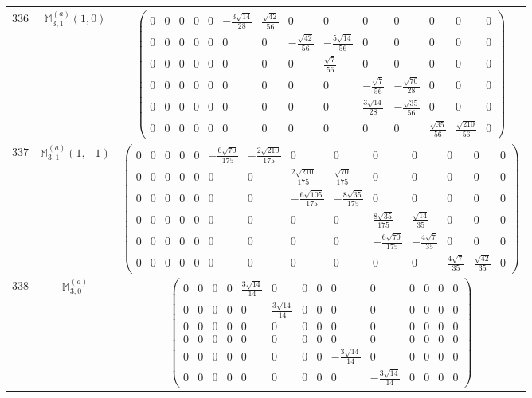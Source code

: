 \documentclass[fleqn,8pt,landscape]{jsarticle}
\begin{document}
\begin{center}
\begin{longtable}{ccc}
$ 336 $ & $ \mathbb{M}_{3,1}^{(a)}(1,0) $ & $ \begin{pmatrix} 0 & 0 & 0 & 0 & 0 & - \frac{3 \sqrt{14}}{28} & \frac{\sqrt{42}}{56} & 0 & 0 & 0 & 0 & 0 & 0 & 0 \\ 0 & 0 & 0 & 0 & 0 & 0 & 0 & - \frac{\sqrt{42}}{56} & - \frac{5 \sqrt{14}}{56} & 0 & 0 & 0 & 0 & 0 \\ 0 & 0 & 0 & 0 & 0 & 0 & 0 & 0 & \frac{\sqrt{7}}{56} & 0 & 0 & 0 & 0 & 0 \\ 0 & 0 & 0 & 0 & 0 & 0 & 0 & 0 & 0 & - \frac{\sqrt{7}}{56} & - \frac{\sqrt{70}}{28} & 0 & 0 & 0 \\ 0 & 0 & 0 & 0 & 0 & 0 & 0 & 0 & 0 & \frac{3 \sqrt{14}}{28} & - \frac{\sqrt{35}}{56} & 0 & 0 & 0 \\ 0 & 0 & 0 & 0 & 0 & 0 & 0 & 0 & 0 & 0 & 0 & \frac{\sqrt{35}}{56} & \frac{\sqrt{210}}{56} & 0 \end{pmatrix} $ \\ \hline
$ 337 $ & $ \mathbb{M}_{3,1}^{(a)}(1,-1) $ & $ \begin{pmatrix} 0 & 0 & 0 & 0 & 0 & - \frac{6 \sqrt{70}}{175} & - \frac{2 \sqrt{210}}{175} & 0 & 0 & 0 & 0 & 0 & 0 & 0 \\ 0 & 0 & 0 & 0 & 0 & 0 & 0 & \frac{2 \sqrt{210}}{175} & \frac{\sqrt{70}}{175} & 0 & 0 & 0 & 0 & 0 \\ 0 & 0 & 0 & 0 & 0 & 0 & 0 & - \frac{6 \sqrt{105}}{175} & - \frac{8 \sqrt{35}}{175} & 0 & 0 & 0 & 0 & 0 \\ 0 & 0 & 0 & 0 & 0 & 0 & 0 & 0 & 0 & \frac{8 \sqrt{35}}{175} & \frac{\sqrt{14}}{35} & 0 & 0 & 0 \\ 0 & 0 & 0 & 0 & 0 & 0 & 0 & 0 & 0 & - \frac{6 \sqrt{70}}{175} & - \frac{4 \sqrt{7}}{35} & 0 & 0 & 0 \\ 0 & 0 & 0 & 0 & 0 & 0 & 0 & 0 & 0 & 0 & 0 & \frac{4 \sqrt{7}}{35} & \frac{\sqrt{42}}{35} & 0 \end{pmatrix} $ \\ \hline
$ 338 $ & $ \mathbb{M}_{3,0}^{(a)} $ & $ \begin{pmatrix} 0 & 0 & 0 & 0 & \frac{3 \sqrt{14}}{14} & 0 & 0 & 0 & 0 & 0 & 0 & 0 & 0 & 0 \\ 0 & 0 & 0 & 0 & 0 & \frac{3 \sqrt{14}}{14} & 0 & 0 & 0 & 0 & 0 & 0 & 0 & 0 \\ 0 & 0 & 0 & 0 & 0 & 0 & 0 & 0 & 0 & 0 & 0 & 0 & 0 & 0 \\ 0 & 0 & 0 & 0 & 0 & 0 & 0 & 0 & 0 & 0 & 0 & 0 & 0 & 0 \\ 0 & 0 & 0 & 0 & 0 & 0 & 0 & 0 & - \frac{3 \sqrt{14}}{14} & 0 & 0 & 0 & 0 & 0 \\ 0 & 0 & 0 & 0 & 0 & 0 & 0 & 0 & 0 & - \frac{3 \sqrt{14}}{14} & 0 & 0 & 0 & 0 \end{pmatrix} $ \\ \hline

\end{longtable}
\end{center}
\end{document}
